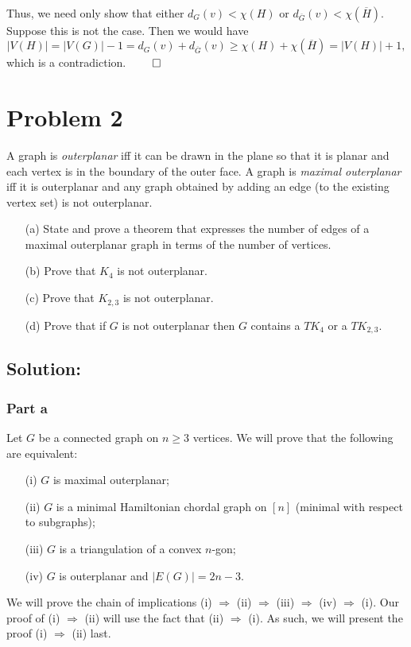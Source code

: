 \documentclass[10pt,a4paper]{article}
\newcommand{\1}{\mathbf{1}}
\begin{document}
\paragraph*{}Thus, we need only show that either $d_{G} (v) < \chi(H)$ or $d_{\overline{G}} (v) < \chi(\overline{H})$.  Suppose this is not the case.  Then we would have
\[
|V(H)| = |V(G)| - 1 = d_{G}(v) + d_{\overline{G}} (v) \geq \chi(H) + \chi(\overline{H}) = |V(H)| + 1,
\]
which is a contradiction. $\qed$
\label{pr:1:end}

\section*{Problem 2}\label{pr:2:start}
A graph is \textit{outerplanar} iff it can be drawn in the plane so that it is planar and each vertex is in the boundary of the outer face.  A graph is \textit{maximal outerplanar} iff it is outerplanar and any graph obtained by adding an edge (to the existing vertex set) is not outerplanar.
\begin{itemize}
\item[(a)] State and prove a theorem that expresses the number of edges of a maximal outerplanar graph in terms of the number of vertices.
\item[(b)] Prove that $K_4$ is not outerplanar.
\item[(c)] Prove that $K_{2,3}$ is not outerplanar.
\item[(d)] Prove that if $G$ is not outerplanar then $G$ contains a $TK_4$ or a $TK_{2,3}$.
\end{itemize}
\subsection*{Solution:}
\subsubsection*{Part a}
Let $G$ be a connected graph on $n \geq 3$ vertices.  We will prove that the following are equivalent:
\begin{itemize}
\item[(i)] $G$ is maximal outerplanar;
\item[(ii)] $G$ is a minimal Hamiltonian chordal graph on $[n]$ (minimal with respect to subgraphs);
\item[(iii)] $G$ is a triangulation of a convex $n$-gon;
\item[(iv)] $G$ is outerplanar and $|E(G)| = 2n - 3$.
\end{itemize}
We will prove the chain of implications (i) $\Rightarrow$ (ii) $\Rightarrow$ (iii) $\Rightarrow$ (iv) $\Rightarrow$ (i).  Our proof of (i) $\Rightarrow$ (ii) will use the fact that (ii) $\Rightarrow$ (i).  As such, we will present the proof (i) $\Rightarrow$ (ii) last.
\end{document}
